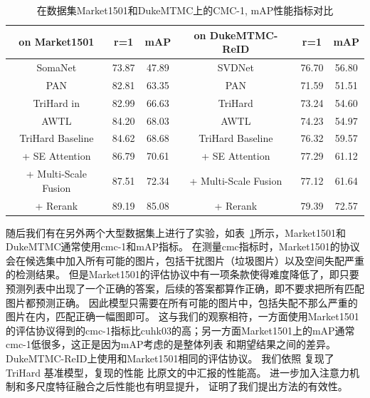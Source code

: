\begin{table}
	\centering
	\caption{在数据集Market1501和DukeMTMC上的CMC-1, mAP性能指标对比}
	\label{tab:market}
	\begin{tabular}{c|cc|c|cc}
		\hline
		on Market1501                        & r=1   & mAP   & on DukeMTMC-ReID & r=1   & mAP   \\ \hline 
		SomaNet                              & 73.87 & 47.89 & SVDNet           & 76.70 & 56.80 \\ 
		PAN                                  & 82.81 & 63.35 & PAN              & 71.59 & 51.51 \\  
		TriHard in \cite{hermans2017defense} & 82.99 & 66.63 & TriHard          & 73.24 & 54.60 \\ 
		AWTL                                 & 84.20 & 68.03 & AWTL             & 74.23 & 54.97 \\ \hline  \hline 
		TriHard Baseline                     & 84.62 & 68.68 & TriHard Baseline & 76.32 & 59.57 \\
		+ SE Attention                       & 86.79 & 70.61 & + SE Attention   & 77.29 & 61.12 \\
		+ Multi-Scale Fusion                 & 87.51 & 72.34 & + Multi-Scale Fusion   & 77.12 & 61.64 \\
		+ Rerank                             & 89.19 & 85.08 & + Rerank         & 79.39 & 72.57 \\ \hline
	\end{tabular}
\end{table}


随后我们有在另外两个大型数据集上进行了实验，如表~\ref{tab:market}所示，Market1501和DukeMTMC通常使用cmc-1和mAP指标。
在测量cmc指标时，Market1501的协议会在候选集中加入所有可能的图片，包括干扰图片（垃圾图片）以及空间失配严重的检测结果。
但是Market1501的评估协议中有一项条款使得难度降低了，即只要预测列表中出现了一个正确的答案，后续的答案都算作正确，即不要求把所有匹配图片都预测正确。
因此模型只需要在所有可能的图片中，包括失配不那么严重的图片在内，匹配正确一幅图即可。
这与我们的观察相符，一方面使用Market1501的评估协议得到的cmc-1指标比cuhk03的高；另一方面Market1501上的mAP通常cmc-1低很多，这正是因为mAP考虑的是整体列表
和期望结果之间的差异。
DukeMTMC-ReID上使用和Market1501相同的评估协议。
我们依照\cite{hermans2017defense} 复现了TriHard 基准模型，复现的性能
比原文的中汇报的性能高。
进一步加入注意力机制和多尺度特征融合之后性能也有明显提升，
证明了我们提出方法的有效性。

